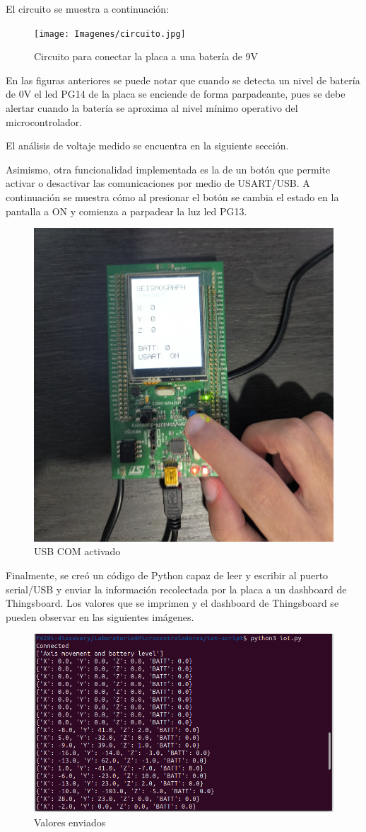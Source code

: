 \documentclass[12pt,a4paper]{article}
\begin{document}
El circuito se muestra a continuación:
\begin{figure}[H]
    \centering
    \texttt{[image: Imagenes/circuito.jpg]}
    \caption{Circuito para conectar la placa a una batería de 9V}
    \label{fig:5}
\end{figure}

En las figuras anteriores se puede notar que cuando se detecta un nivel de batería de 0V el led PG14 de la placa se enciende de forma parpadeante, pues se debe alertar cuando la batería se aproxima al nivel mínimo operativo del microcontrolador.

El análisis de voltaje medido se encuentra en la siguiente sección.


Asimismo, otra funcionalidad implementada es la de un botón que permite activar o desactivar las comunicaciones por medio de USART/USB. A continuación se muestra cómo al presionar el botón se cambia el estado en la pantalla a ON y comienza a parpadear la luz led PG13.

\begin{figure}[H]
    \centering
    \includegraphics[width=0.5\linewidth]{Imagenes/led.jpg}
    \caption{USB COM activado}
    \label{fig:5}
\end{figure}

Finalmente, se creó un código de Python capaz de leer y escribir al puerto serial/USB y enviar la información recolectada por la placa a un dashboard de Thingsboard. Los valores que se imprimen y el dashboard de Thingsboard se pueden observar en las siguientes imágenes.
\begin{figure}[H]
    \centering
    \includegraphics[width=0.8\linewidth]{Imagenes/consola.png}
    \caption{Valores enviados}
    \label{fig:5}
\end{figure}
\end{document}
